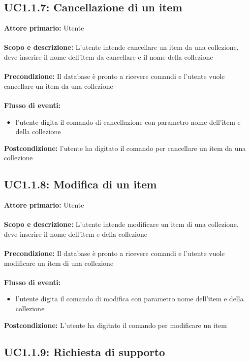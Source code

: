 \documentclass{scalatekids-article}
\begin{document}
\subsection{UC1.1.7: Cancellazione di un item}
\textbf{Attore primario:} Utente \\ \\
\textbf{Scopo e descrizione:} L’utente intende cancellare un item da una collezione, deve inserire il nome dell’item da cancellare e il nome della collezione\\ \\
\textbf{Precondizione:} Il database è pronto a ricevere comandi e l’utente vuole cancellare un item da una collezione\\ \\
\textbf{Flusso di eventi:}
\begin{itemize}
\item l’utente digita il comando di cancellazione con parametro nome dell’item e della collezione
\end{itemize}
\textbf{Postcondizione:} l’utente ha digitato il comando per cancellare un item da una collezione
\subsection{UC1.1.8: Modifica di un item}
\textbf{Attore primario:} Utente \\ \\
\textbf{Scopo e descrizione:} L’utente intende modificare un item di una collezione, deve inserire il nome dell’item e della collezione\\ \\
\textbf{Precondizione:} Il database è pronto a ricevere comandi e l’utente vuole modificare un item di una collezione\\ \\
\textbf{Flusso di eventi:}
\begin{itemize}
\item l’utente digita il comando di modifica con parametro nome dell’item e della collezione
\end{itemize}
\textbf{Postcondizione:} L’utente ha digitato il comando per modificare un item
\subsection{UC1.1.9: Richiesta di supporto}
\end{document}

